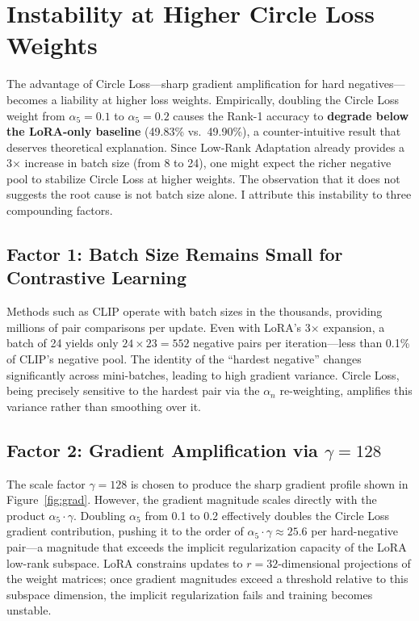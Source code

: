 \documentclass[../main.tex]{subfiles}
\begin{document}
\section{Instability at Higher Circle Loss Weights}
\label{sec:instability}

The advantage of Circle Loss---sharp gradient amplification for hard negatives---becomes a liability at higher loss weights. Empirically, doubling the Circle Loss weight from $\alpha_5{=}0.1$ to $\alpha_5{=}0.2$ causes the Rank-1 accuracy to \textbf{degrade below the LoRA-only baseline} (49.83\% vs.\ 49.90\%), a counter-intuitive result that deserves theoretical explanation. Since Low-Rank Adaptation already provides a 3$\times$ increase in batch size (from 8 to 24), one might expect the richer negative pool to stabilize Circle Loss at higher weights. The observation that it does not suggests the root cause is not batch size alone. I attribute this instability to three compounding factors.

\subsection*{Factor 1: Batch Size Remains Small for Contrastive Learning}

Methods such as CLIP operate with batch sizes in the thousands, providing millions of pair comparisons per update. Even with LoRA's 3$\times$ expansion, a batch of 24 yields only $24 \times 23 = 552$ negative pairs per iteration---less than 0.1\% of CLIP's negative pool. The identity of the ``hardest negative'' changes significantly across mini-batches, leading to high gradient variance. Circle Loss, being precisely sensitive to the hardest pair via the $\alpha_n$ re-weighting, amplifies this variance rather than smoothing over it.

\subsection*{Factor 2: Gradient Amplification via $\gamma{=}128$}

The scale factor $\gamma{=}128$ is chosen to produce the sharp gradient profile shown in Figure~\ref{fig:grad}. However, the gradient magnitude scales directly with the product $\alpha_5 \cdot \gamma$. Doubling $\alpha_5$ from 0.1 to 0.2 effectively doubles the Circle Loss gradient contribution, pushing it to the order of $\alpha_5 \cdot \gamma \approx 25.6$ per hard-negative pair---a magnitude that exceeds the implicit regularization capacity of the LoRA low-rank subspace. LoRA constrains updates to $r{=}32$-dimensional projections of the weight matrices; once gradient magnitudes exceed a threshold relative to this subspace dimension, the implicit regularization fails and training becomes unstable.
\end{document}
